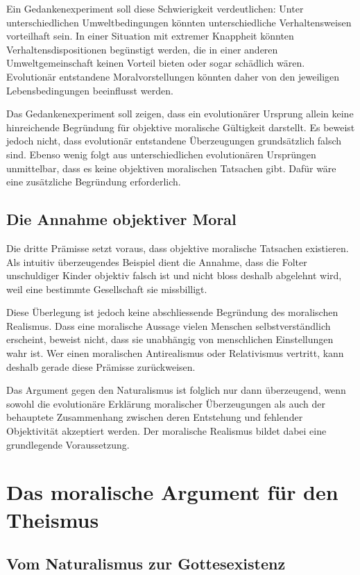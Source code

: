 \documentclass[a4paper,11pt]{article}
\begin{document}
	Ein Gedankenexperiment soll diese Schwierigkeit verdeutlichen:
	Unter unterschiedlichen Umweltbedingungen könnten unterschiedliche
	Verhaltensweisen vorteilhaft sein. In einer Situation mit extremer
	Knappheit könnten Verhaltensdispositionen begünstigt werden, die
	in einer anderen Umweltgemeinschaft keinen Vorteil bieten oder
	sogar schädlich wären. Evolutionär entstandene Moralvorstellungen
	könnten daher von den jeweiligen Lebensbedingungen beeinflusst
	werden.
	
	Das Gedankenexperiment soll zeigen, dass ein evolutionärer
	Ursprung allein keine hinreichende Begründung für objektive
	moralische Gültigkeit darstellt. Es beweist jedoch nicht, dass
	evolutionär entstandene Überzeugungen grundsätzlich falsch sind.
	Ebenso wenig folgt aus unterschiedlichen evolutionären Ursprüngen
	unmittelbar, dass es keine objektiven moralischen Tatsachen gibt.
	Dafür wäre eine zusätzliche Begründung erforderlich.
	
	\subsection{Die Annahme objektiver Moral}
	
	Die dritte Prämisse setzt voraus, dass objektive moralische Tatsachen
	existieren. Als intuitiv überzeugendes Beispiel dient die Annahme,
	dass die Folter unschuldiger Kinder objektiv falsch ist und nicht
	bloss deshalb abgelehnt wird, weil eine bestimmte Gesellschaft
	sie missbilligt.
	
	Diese Überlegung ist jedoch keine abschliessende Begründung des
	moralischen Realismus. Dass eine moralische Aussage vielen
	Menschen selbstverständlich erscheint, beweist nicht, dass sie
	unabhängig von menschlichen Einstellungen wahr ist. Wer einen
	moralischen Antirealismus oder Relativismus vertritt, kann deshalb
	gerade diese Prämisse zurückweisen.
	
	Das Argument gegen den Naturalismus ist folglich nur dann
	überzeugend, wenn sowohl die evolutionäre Erklärung moralischer
	Überzeugungen als auch der behauptete Zusammenhang zwischen
	deren Entstehung und fehlender Objektivität akzeptiert werden.
	Der moralische Realismus bildet dabei eine grundlegende
	Voraussetzung.
	
	\section{Das moralische Argument für den Theismus}
	
	\subsection{Vom Naturalismus zur Gottesexistenz}
	
\end{document}
